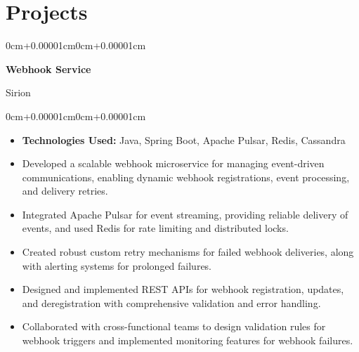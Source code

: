 \documentclass[10pt, letterpaper]{article}
\newenvironment{highlights}{
    \begin{itemize}[topsep=0.10cm,parsep=0.10cm,partopsep=0pt,itemsep=0pt,leftmargin=0cm+10pt]
}{
    \end{itemize}
}
\newenvironment{onecolentry}{
    \begin{adjustwidth}{0cm+0.00001cm}{0cm+0.00001cm}
}{
    \end{adjustwidth}
}
\newenvironment{twocolentry}[2][]{
    \onecolentry
    \def\secondColumn{#2}
    \setcolumnwidth{\fill, 4.5cm}
    \begin{paracol}{2}
}{
    \switchcolumn \raggedleft \secondColumn
    \end{paracol}
    \endonecolentry
}
\begin{document}
    \vspace{0.2cm}

    \section{Projects}

    \begin{twocolentry}{Sirion}
        \textbf{Webhook Service}
    \end{twocolentry}
    \vspace{0.10cm}
    \begin{onecolentry}
        \begin{highlights}
            \item \textbf{Technologies Used:} Java, Spring Boot, Apache Pulsar, Redis, Cassandra
            \item Developed a scalable webhook microservice for managing event-driven communications, enabling dynamic webhook registrations, event processing, and delivery retries.
            \item Integrated Apache Pulsar for event streaming, providing reliable delivery of events, and used Redis for rate limiting and distributed locks.
            \item Created robust custom retry mechanisms for failed webhook deliveries, along with alerting systems for prolonged failures.
            \item Designed and implemented REST APIs for webhook registration, updates, and deregistration with comprehensive validation and error handling.
            \item Collaborated with cross-functional teams to design validation rules for webhook triggers and implemented monitoring features for webhook failures.
        \end{highlights}
    \end{onecolentry}

    \vspace{0.15cm}
\end{document}
